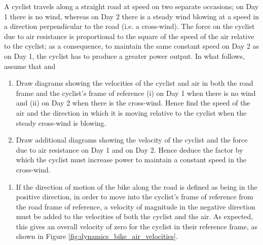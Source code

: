 
\begin{problem} 
{A cyclist travels along a straight road at speed  on two separate occasions; on Day 1 there is no wind, whereas on Day 2 there is a steady wind blowing at a speed  in a direction perpendicular to the road (i.e. a cross-wind). The force on the cyclist due to air resistance is proportional to the square of the speed of the air relative to the cyclist; as a consequence, to maintain the same constant speed  on Day 2 as on Day 1, the cyclist has to produce a greater power output. In what follows, assume that  and 
\begin{enumerate}
\item Draw diagrams showing the velocities of the cyclist and air in both the road frame and the cyclist's frame of reference (i) on Day 1 when there is no wind and (ii) on Day 2 when there is the cross-wind. Hence find the speed of the air and the
direction in which it is moving relative to the cyclist when the steady cross-wind is blowing.
\item  Draw additional diagrams showing the velocity of the cyclist and the force due to air resistance on Day 1 and on Day 2. Hence deduce the factor by which the cyclist must increase power to maintain a constant speed in the cross-wind.
\end{enumerate}}
{}
{\begin{enumerate}
\item 
If the direction of motion of the bike along the road is defined as being in the positive   direction, in order to move into the cyclist's frame of reference from the road frame of reference, a velocity of magnitude  in the negative  direction must be added to the velocities of both the cyclist and the air. As expected, this gives an overall velocity of zero for the cyclist in their reference frame, as shown in Figure \ref{fig:dynamics_bike_air_velocities}.


\end{enumerate}}
\end{problem}
